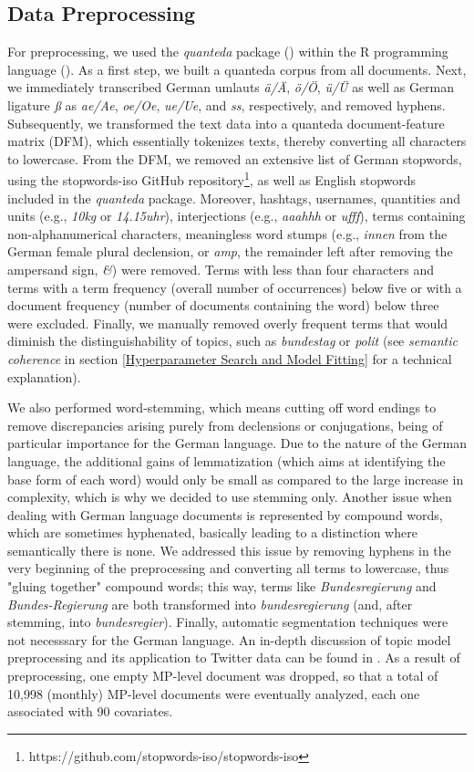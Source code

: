 \subsection{Data Preprocessing}
\label{Data Preprocessing}

For preprocessing, we used the \textit{quanteda} package (\citealp{quanteda}) within the R programming language (\citealp{R}). As a first step, we built a quanteda corpus from all documents. Next, we immediately transcribed German umlauts \textit{ä/Ä}, \textit{ö/Ö}, \textit{ü/Ü} as well as German ligature \textit{ß} as \textit{ae/Ae}, \textit{oe/Oe}, \textit{ue/Ue}, and \textit{ss}, respectively, and removed hyphens. Subsequently, we transformed the text data into a quanteda document-feature matrix (DFM), which essentially tokenizes texts, thereby converting all characters to lowercase. From the DFM, we removed an extensive list of German stopwords, using the stopwords-iso GitHub repository\footnote{https://github.com/stopwords-iso/stopwords-iso}, as well as English stopwords included in the \textit{quanteda} package. Moreover, hashtags, usernames, quantities and units (e.g., \textit{10kg} or \textit{14.15uhr}), interjections (e.g., \textit{aaahhh} or \textit{ufff}), terms containing non-alphanumerical characters, meaningless word stumps (e.g., \textit{innen} from the German female plural declension, or \textit{amp}, the remainder left after removing the ampersand sign, \textit{\&}) were removed. Terms with less than four characters and terms with a term frequency (overall number of occurrences) below five or with a document frequency (number of documents containing the word) below three were excluded. Finally, we manually removed overly frequent terms that would diminish the distinguishability of topics, such as \textit{bundestag} or \textit{polit} (see \textit{semantic coherence} in section \ref{Hyperparameter Search and Model Fitting} for a technical explanation).

We also performed word-stemming, which means cutting off word endings to remove discrepancies arising purely from declensions or conjugations, being of particular importance for the German language. Due to the nature of the German language, the additional gains of lemmatization (which aims at identifying the base form of each word) would only be small as compared to the large increase in complexity, which is why we decided to use stemming only. Another issue when dealing with German language documents is represented by compound words, which are sometimes hyphenated, basically leading to a distinction where semantically there is none. We addressed this issue by removing hyphens in the very beginning of the preprocessing and converting all terms to lowercase, thus "gluing together" compound words; this way, terms like \textit{Bundesregierung} and \textit{Bundes-Regierung} are both transformed into \textit{bundesregierung} (and, after stemming, into \textit{bundesregier}). Finally, automatic segmentation techniques were not necesssary for the German language. An in-depth discussion of topic model preprocessing and its application to Twitter data can be found in \cite{lucas2015computer}. As a result of preprocessing, one empty MP-level document was dropped, so that a total of 10,998 (monthly) MP-level documents were eventually analyzed, each one associated with 90 covariates.